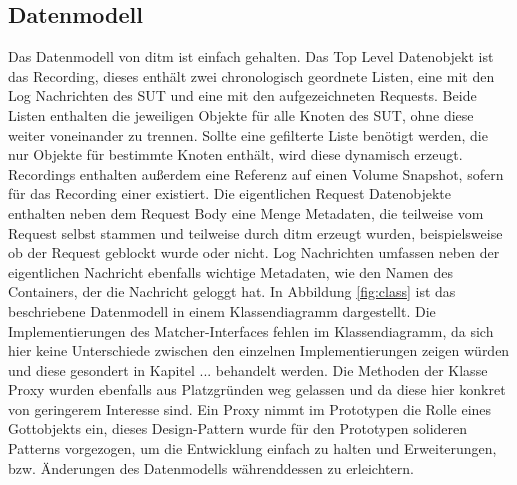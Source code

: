 \documentclass[12pt,a4paper]{report}
\begin{document}
\subsection{Datenmodell}
Das Datenmodell von ditm ist einfach gehalten. Das Top Level Datenobjekt ist das Recording, dieses enthält zwei chronologisch
geordnete Listen, eine mit den Log Nachrichten des SUT und eine mit den aufgezeichneten Requests. Beide Listen enthalten
die jeweiligen Objekte für alle Knoten des SUT, ohne diese weiter voneinander zu trennen. Sollte eine gefilterte Liste
benötigt werden, die nur Objekte für bestimmte Knoten enthält, wird diese dynamisch erzeugt. Recordings enthalten außerdem
eine Referenz auf einen Volume Snapshot, sofern für das Recording einer existiert.
Die eigentlichen Request Datenobjekte enthalten neben dem Request Body eine Menge Metadaten, die teilweise vom Request selbst
stammen und teilweise durch ditm erzeugt wurden, beispielsweise ob der Request geblockt wurde oder nicht.
Log Nachrichten umfassen neben der eigentlichen Nachricht ebenfalls wichtige Metadaten, wie den Namen des Containers, der die
Nachricht geloggt hat. In Abbildung \ref{fig:class} ist das beschriebene Datenmodell in einem Klassendiagramm dargestellt. Die
Implementierungen des Matcher-Interfaces fehlen im Klassendiagramm, da sich hier keine Unterschiede zwischen den einzelnen
Implementierungen zeigen würden und diese gesondert in Kapitel ... behandelt werden. Die Methoden der Klasse Proxy wurden
ebenfalls aus Platzgründen weg gelassen und da diese hier konkret von geringerem Interesse sind. Ein Proxy nimmt im Prototypen die
Rolle eines Gottobjekts ein, dieses Design-Pattern wurde für den Prototypen solideren Patterns vorgezogen, um die Entwicklung
einfach zu halten und Erweiterungen, bzw. Änderungen des Datenmodells währenddessen zu erleichtern.
\end{document}
